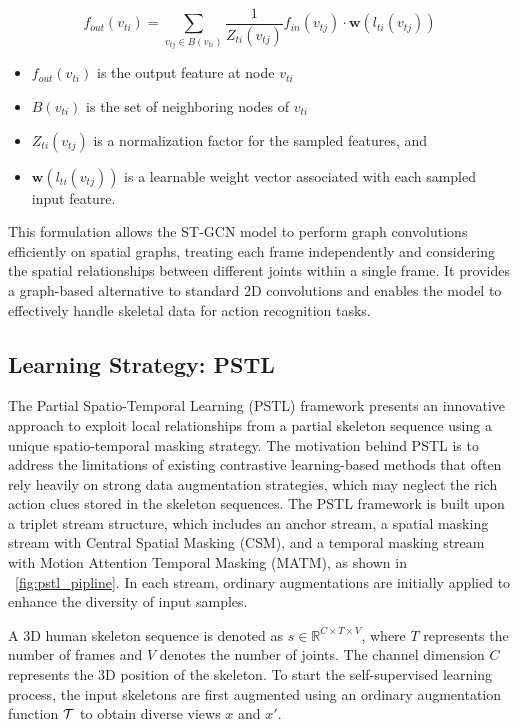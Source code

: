 $$
f_{o u t}\left(v_{t i}\right)=\sum_{v_{t j} \in B\left(v_{t i}\right)} \frac{1}{Z_{t i}\left(v_{t j}\right)} f_{i n}\left(v_{t j}\right) \cdot \mathbf{w}\left(l_{t i}\left(v_{t j}\right)\right)
$$

\begin{itemize}
	\item $f_{out}(v_{ti})$ is the output feature at node $v_{ti}$
	\item $B(v_{ti})$ is the set of neighboring nodes of $v_{ti}$
	\item $Z_{ti}(v_{tj})$ is a normalization factor for the sampled features, and 
	\item $\mathbf{w}(l_{ti}(v_{tj}))$  is a learnable weight vector associated with each sampled input feature.
\end{itemize}

This formulation allows the ST-GCN model to perform graph convolutions efficiently on spatial graphs, treating each frame independently and considering the spatial relationships between different joints within a single frame. It provides a graph-based alternative to standard 2D convolutions and enables the model to effectively handle skeletal data for action recognition tasks.

\subsection{Learning Strategy: PSTL}
The Partial Spatio-Temporal Learning (PSTL) framework presents an innovative approach to exploit local relationships from a partial skeleton sequence using a unique spatio-temporal masking strategy. The motivation behind PSTL is to address the limitations of existing contrastive learning-based methods that often rely heavily on strong data augmentation strategies, which may neglect the rich action clues stored in the skeleton sequences. The PSTL framework is built upon a triplet stream structure, which includes an anchor stream, a spatial masking stream with Central Spatial Masking (CSM), and a temporal masking stream with Motion Attention Temporal Masking (MATM), as shown in ~\ref{fig:pstl_pipline}. In each stream, ordinary augmentations are initially applied to enhance the diversity of input samples.

A 3D human skeleton sequence is denoted as \(s \in \mathbb{R}^{C \times T \times V}\), where \(T\) represents the number of frames and \(V\) denotes the number of joints. The channel dimension \(C\) represents the 3D position of the skeleton. To start the self-supervised learning process, the input skeletons are first augmented using an ordinary augmentation function $\mathcal{T}$ to obtain diverse views \(x\) and \(x'\).

